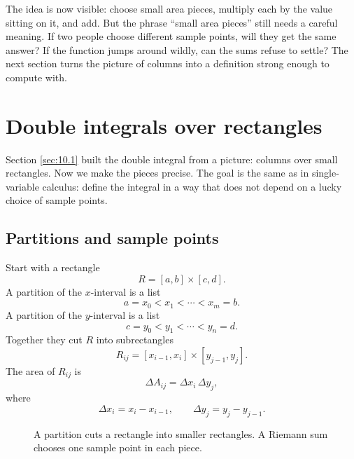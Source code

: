 The idea is now visible: choose small area pieces, multiply each by the value sitting on
it, and add.  But the phrase ``small area pieces'' still needs a careful meaning.  If two
people choose different sample points, will they get the same answer?  If the function
jumps around wildly, can the sums refuse to settle?  The next section turns the picture
of columns into a definition strong enough to compute with.

\section{Double integrals over rectangles}
\label{sec:10.2}

Section \ref{sec:10.1} built the double integral from a picture: columns over small
rectangles.  Now we make the pieces precise.  The goal is the same as in
single-variable calculus: define the integral in a way that does not depend on a lucky
choice of sample points.

\subsection{Partitions and sample points}

Start with a rectangle
\[
    R=[a,b]\times[c,d].
\]
A partition of the \(x\)-interval is a list
\[
    a=x_0<x_1<\cdots<x_m=b.
\]
A partition of the \(y\)-interval is a list
\[
    c=y_0<y_1<\cdots<y_n=d.
\]
Together they cut \(R\) into subrectangles
\[
    R_{ij}=[x_{i-1},x_i]\times[y_{j-1},y_j].
\]
The area of \(R_{ij}\) is
\[
    \Delta A_{ij}=\Delta x_i\,\Delta y_j,
\]
where
\[
    \Delta x_i=x_i-x_{i-1},
    \qquad
    \Delta y_j=y_j-y_{j-1}.
\]

\begin{figure}[h]
\centering
{}
\caption{A partition cuts a rectangle into smaller rectangles.  A Riemann sum chooses
one sample point in each piece.}
\end{figure}

